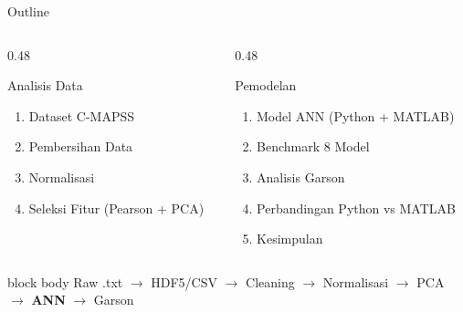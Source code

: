 \documentclass[aspectratio=169, 11pt]{beamer}
\begin{document}
\begin{frame}{Outline}
  \begin{columns}[t]
    \begin{column}{0.48\textwidth}
      \begin{block}{Analisis Data}
        \begin{enumerate}
          \item Dataset C-MAPSS
          \item Pembersihan Data
          \item Normalisasi
          \item Seleksi Fitur (Pearson + PCA)
        \end{enumerate}
      \end{block}
    \end{column}
    \begin{column}{0.48\textwidth}
      \begin{block}{Pemodelan}
        \begin{enumerate}[start=5]
          \item Model ANN (Python + MATLAB)
          \item Benchmark 8 Model
          \item Analisis Garson
          \item Perbandingan Python vs MATLAB
          \item Kesimpulan
        \end{enumerate}
      \end{block}
    \end{column}
  \end{columns}

  \vspace{0.4cm}
  \centering\small
  \begin{beamercolorbox}[sep=4pt]{block body}
\color{uiblue}
      Raw .txt $\rightarrow$ HDF5/CSV $\rightarrow$ Cleaning
      $\rightarrow$ Normalisasi $\rightarrow$ PCA
      $\rightarrow$ \textbf{ANN} $\rightarrow$ Garson
\end{beamercolorbox}
\end{frame}
\end{document}
